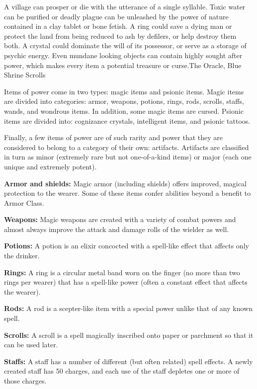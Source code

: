 {A village can prosper or die with the utterance of a single syllable. Toxic water can be purified or deadly plague can be unleashed by the power of nature contained in a clay tablet or bone fetish. A ring could save a dying man or protect the land from being reduced to ash by defilers, or help destroy them both. A crystal could dominate the will of its possessor, or serve as a storage of psychic energy. Even mundane looking objects can contain highly sought after power, which makes every item a potential treasure or curse.}{The Oracle, Blue Shrine Scrolls}

Items of power come in two types: magic items and psionic items. Magic items are divided into categories: armor, weapons, potions, rings, rods, scrolls, staffs, wands, and wondrous items. In addition, some magic items are cursed. Psionic items are divided into: cognizance crystals, intelligent items, and psionic tattoos.

Finally, a few items of power are of such rarity and power that they are considered to belong to a category of their own: artifacts. Artifacts are classified in turn as minor (extremely rare but not one-of-a-kind items) or major (each one unique and extremely potent).

\textbf{Armor and shields:} Magic armor (including shields) offers improved, magical protection to the wearer. Some of these items confer abilities beyond a benefit to Armor Class.

\textbf{Weapons:} Magic weapons are created with a variety of combat powers and almost always improve the attack and damage rolls of the wielder as well.

\textbf{Potions:} A potion is an elixir concocted with a spell-like effect that affects only the drinker.

\textbf{Rings:} A ring is a circular metal band worn on the finger (no more than two rings per wearer) that has a spell-like power (often a constant effect that affects the wearer).

\textbf{Rods:} A rod is a scepter-like item with a special power unlike that of any known spell.

\textbf{Scrolls:} A scroll is a spell magically inscribed onto paper or parchment so that it can be used later.

\textbf{Staffs:} A staff has a number of different (but often related) spell effects. A newly created staff has 50 charges, and each use of the staff depletes one or more of those charges.

